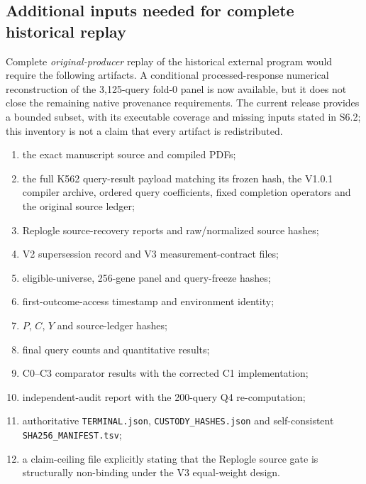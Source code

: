 \documentclass[11pt]{article}
\begin{document}
\subsection{Additional inputs needed for complete historical replay}
Complete \emph{original-producer} replay of the historical external program would require the following artifacts. A conditional processed-response numerical reconstruction of the 3,125-query fold-0 panel is now available, but it does not close the remaining native provenance requirements. The current release provides a bounded subset, with its executable coverage and missing inputs stated in S6.2; this inventory is not a claim that every artifact is redistributed.
\begin{enumerate}
\item the exact manuscript source and compiled PDFs;
\item the full K562 query-result payload matching its frozen hash, the V1.0.1 compiler archive, ordered query coefficients, fixed completion operators and the original source ledger;
\item Replogle source-recovery reports and raw/normalized source hashes;
\item V2 supersession record and V3 measurement-contract files;
\item eligible-universe, 256-gene panel and query-freeze hashes;
\item first-outcome-access timestamp and environment identity;
\item $P$, $C$, $Y$ and source-ledger hashes;
\item final query counts and quantitative results;
\item C0--C3 comparator results with the corrected C1 implementation;
\item independent-audit report with the 200-query Q4 re-computation;
\item authoritative \texttt{TERMINAL.json}, \texttt{CUSTODY\_HASHES.json} and self-consistent \texttt{SHA256\_MANIFEST.tsv};
\item a claim-ceiling file explicitly stating that the Replogle source gate is structurally non-binding under the V3 equal-weight design.
\end{enumerate}
\end{document}
